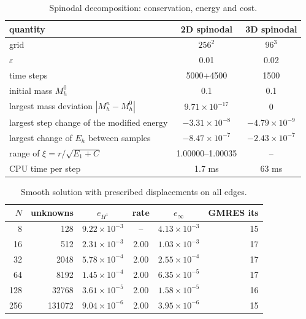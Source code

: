 \documentclass[11pt]{article}
\begin{document}
\clearpage
\begin{table}[htbp]\centering\small
\caption{Spinodal decomposition: conservation, energy and cost.}
\begin{tabular}{p{} cc}
\toprule
quantity & 2D spinodal & 3D spinodal\\
\midrule
grid & $256^2$ & $96^3$\\
$\varepsilon$ & 0.01 & 0.02\\
time steps & 5000+4500 & 1500\\
initial mass $M_h^0$ & 0.1 & 0.1\\
largest mass deviation $|M_h^n-M_h^0|$ & $9.71{\times}10^{-17}$ & 0\\
largest step change of the modified energy & $-3.31{\times}10^{-8}$ & $-4.79{\times}10^{-9}$\\
largest change of $E_h$ between samples & $-8.47{\times}10^{-7}$ & $-2.43{\times}10^{-7}$\\
range of $\xi=r/\sqrt{E_1+C}$ & 1.00000--1.00035 & --\\
CPU time per step & 1.7 ms & 63 ms\\
\bottomrule
\end{tabular}
\end{table}

\begin{table}[htbp]\centering\small
\caption{Smooth solution with prescribed displacements on all edges.}
\begin{tabular}{rr cc cr}
\toprule
$N$ & unknowns & $e_{H^1}$ & rate & $e_\infty$ & GMRES its\\
\midrule
8 & 128 & $9.22{\times}10^{-3}$ & -- & $4.13{\times}10^{-3}$ & 15\\
16 & 512 & $2.31{\times}10^{-3}$ & 2.00 & $1.03{\times}10^{-3}$ & 17\\
32 & 2048 & $5.78{\times}10^{-4}$ & 2.00 & $2.55{\times}10^{-4}$ & 17\\
64 & 8192 & $1.45{\times}10^{-4}$ & 2.00 & $6.35{\times}10^{-5}$ & 17\\
128 & 32768 & $3.61{\times}10^{-5}$ & 2.00 & $1.58{\times}10^{-5}$ & 16\\
256 & 131072 & $9.04{\times}10^{-6}$ & 2.00 & $3.95{\times}10^{-6}$ & 15\\
\bottomrule
\end{tabular}
\end{table}
\end{document}
